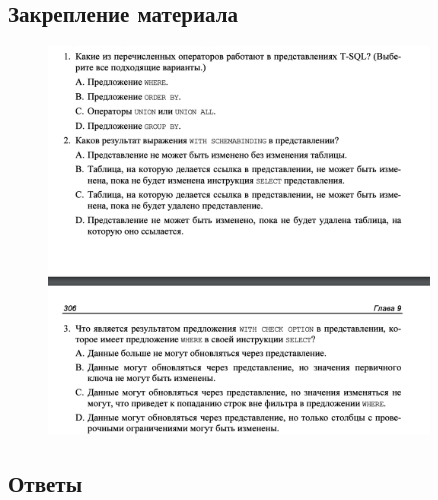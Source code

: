 \subsection*{Закрепление материала}

\begin{figure}[h!]
	\begin{center}
		\includegraphics[width=0.9\textwidth]{img/zakrep17.png}
	\end{center}
	\captionsetup{justification=centering}
\end{figure}
\newpage

\subsection*{Ответы}

